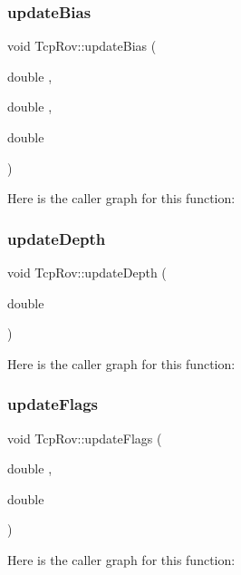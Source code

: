 \subsubsection{\texorpdfstring{update\+Bias}{updateBias}}
{\footnotesize\ttfamily void Tcp\+Rov\+::update\+Bias (\begin{DoxyParamCaption}\item[{double}]{,  }\item[{double}]{,  }\item[{double}]{ }\end{DoxyParamCaption})\hspace{0.3cm}{\ttfamily [signal]}}

Here is the caller graph for this function\+:
\mbox{\label{class_tcp_rov_ab201a7065564d4eab11ac71f101c47ff}} 
\subsubsection{\texorpdfstring{update\+Depth}{updateDepth}}
{\footnotesize\ttfamily void Tcp\+Rov\+::update\+Depth (\begin{DoxyParamCaption}\item[{double}]{ }\end{DoxyParamCaption})\hspace{0.3cm}{\ttfamily [signal]}}

Here is the caller graph for this function\+:
\mbox{\label{class_tcp_rov_a3b76d01ab849c7072c9357258d93ffa2}} 
\subsubsection{\texorpdfstring{update\+Flags}{updateFlags}}
{\footnotesize\ttfamily void Tcp\+Rov\+::update\+Flags (\begin{DoxyParamCaption}\item[{double}]{,  }\item[{double}]{ }\end{DoxyParamCaption})\hspace{0.3cm}{\ttfamily [signal]}}

Here is the caller graph for this function\+:
\mbox{\label{class_tcp_rov_aa5f708b5730bfbcf64a5a518dac5e473}} 
